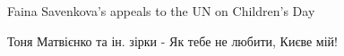













Faina Savenkova's appeals to the UN on Children's Day

Тоня Матвієнко та ін. зірки - Як тебе не любити, Києве мій!

